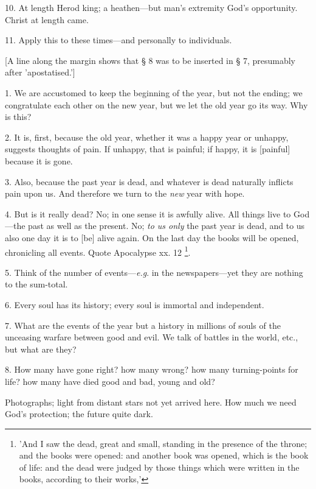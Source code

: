 10. At length Herod king; a heathen—but man's
extremity God's opportunity. Christ at length came.

11. Apply this to these times—and personally to
individuals.

[A line along the margin shows that § 8 was to
be inserted in § 7, presumably after 'apostatised.']


1. We are accustomed to keep the beginning of the
year, but not the ending; we congratulate each other on the new
year, but we let the old year go its way. Why is this?

2. It is, first, because the old year, whether it
was a happy year or unhappy, suggests thoughts of pain. If unhappy,
that is painful; if happy, it is [painful] because it is gone.

3. Also, because the past year is dead, and
whatever is dead naturally inflicts pain upon us. And therefore we
turn to the \emph{new} year with hope.

4. But is it really dead? No; in one sense it is
awfully alive. All things live to God—the past as well as the
present. No; \emph{to us only} the past year is dead, and to us also
one day it is to [be] alive again. On the last day the books will be
opened, chronicling all events. Quote Apocalypse xx. 12 \footnote{'And I saw the dead,
great and small, standing in the presence of the throne; and the books
were opened: and another book was opened, which is the book of life:
and the dead were judged by those things which were written in the
books, according to their works,'}.

5. Think of the number of events—\emph{e.g}. in
the newspapers—yet they are nothing to the sum-total.

6. Every soul has its history; every soul is
immortal and independent.

7. What are the events of the year but a history
in millions of souls of the unceasing warfare between good and evil.
We talk of battles in the world, etc., but what are they?

8. How many have gone right? how many wrong? how
many turning-points for life? how many have died good and bad, young
and old?

Photographs; light from distant stars not yet
arrived here. How much we need God's protection; the future quite
dark.


